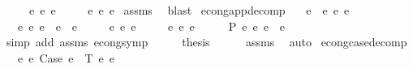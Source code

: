 \begin{isabellebody}
\ \ \ \ {\isasymand}\ e{}{\isacharprime}{\kern0pt}\ {\isasymsimeq}e\ e{}\isanewline
\ \ \ \ {\isasymand}\ e{}{\isacharprime}{\kern0pt}\ {\isasymsimeq}e\ e{}{\isachardoublequoteclose}\isanewline
%
\isadelimproof
%
\endisadelimproof
%
\isatagproof
{}\isamarkupfalse%
\ assms\ \isamarkupfalse%
\ blast%
\endisatagproof
{\isafoldproof}%
%
\isadelimproof
\isanewline
%
\endisadelimproof
\isanewline
\isanewline
{}\isamarkupfalse%
\ econg{\isacharunderscore}{\kern0pt}app{\isacharunderscore}{\kern0pt}decomp{}{\isacharcolon}{\kern0pt}\isanewline
\ \ \ {\isachardoublequoteopen}e{}\ {\isasymcdot}\ e{}\ {\isasymsimeq}e\ e{\isacharprime}{\kern0pt}{\isachardoublequoteclose}\isanewline
\ \ \ {\isachardoublequoteopen}{\isasymexists}e{}{\isacharprime}{\kern0pt}\ e{}{\isacharprime}{\kern0pt}{\isachardot}{\kern0pt}\ e{\isacharprime}{\kern0pt}\ {\isacharequal}{\kern0pt}\ e{}{\isacharprime}{\kern0pt}\ {\isasymcdot}\ e{}{\isacharprime}{\kern0pt}\isanewline
\ \ \ \ {\isasymand}\ e{}\ {\isasymsimeq}e\ e{}{\isacharprime}{\kern0pt}\isanewline
\ \ \ \ {\isasymand}\ e{}\ {\isasymsimeq}e\ e{}{\isacharprime}{\kern0pt}{\isachardoublequoteclose}\isanewline
%
\isadelimproof
%
\endisadelimproof
%
\isatagproof
{}\isamarkupfalse%
\ {\isacharminus}{\kern0pt}\isanewline
\ \ \isamarkupfalse%
\ P{}{\isacharcolon}{\kern0pt}\ {\isachardoublequoteopen}e{\isacharprime}{\kern0pt}\ {\isasymsimeq}e\ e{}\ {\isasymcdot}\ e{}{\isachardoublequoteclose}\isanewline
\ \ \ \ \isamarkupfalse%
\ {\isacharparenleft}{\kern0pt}simp\ add{\isacharcolon}{\kern0pt}\ assms\ econg{\isacharunderscore}{\kern0pt}symp{\isacharparenright}{\kern0pt}\isanewline
\ \ \isamarkupfalse%
\ \isamarkupfalse%
\ {\isacharquery}{\kern0pt}thesis\isanewline
\ \ \ \ \isamarkupfalse%
\ assms\ \isamarkupfalse%
\ auto\isanewline
{}\isamarkupfalse%
%
\endisatagproof
{\isafoldproof}%
%
\isadelimproof
\isanewline
%
\endisadelimproof
\isanewline
\isanewline
{}\isamarkupfalse%
\ econg{\isacharunderscore}{\kern0pt}case{\isacharunderscore}{\kern0pt}decomp{\isacharcolon}{\kern0pt}\isanewline
\ \ \ {\isachardoublequoteopen}e{\isacharprime}{\kern0pt}\ {\isasymsimeq}e\ Case\ e{}\ {\isasymGamma}\ T\ e{}\ e{}{\isachardoublequoteclose}\isanewline

\end{isabellebody}
